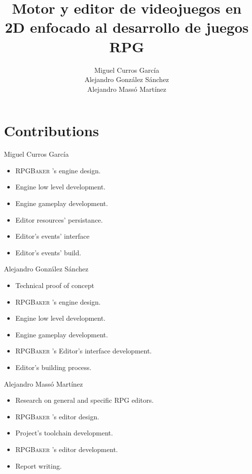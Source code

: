 \documentclass[aspectratio=169]{beamer}
\newcommand{\baker}{%
	\textsc{RPGBaker}%
}
\begin{document}
\title[2D video game engine and editor focused on RPG game development]{Motor y editor de videojuegos en 2D enfocado al desarrollo de juegos RPG}
\author[Miguel Curros, Alejandro González and Alejandro Massó]{Miguel Curros García\\ Alejandro González Sánchez\\ Alejandro Massó Martínez}

\section{Contributions}
\begin{frame}{Miguel Curros García}
	\begin{itemize}
		\item \baker{}'s engine design.
		\item Engine low level development.
		\item Engine gameplay development.
		\item Editor resources' persistance.
		\item Editor's events' interface
		\item Editor's events' build.
	\end{itemize}
\end{frame}

\begin{frame}{Alejandro González Sánchez}
	\begin{itemize}
		\item Technical proof of concept
		\item \baker{}'s engine design.
		\item Engine low level development.
		\item Engine gameplay development.
		\item \baker{}'s Editor's interface development.
		\item Editor's building process.
	\end{itemize}
\end{frame}

\begin{frame}{Alejandro Massó Martínez}
	\begin{itemize}
		\item Research on general and specific RPG editors.
		\item \baker{}'s editor design.
		\item Project's toolchain development.
		\item \baker{}'s editor development.
		\item Report writing.
	\end{itemize}
\end{frame}
\end{document}
